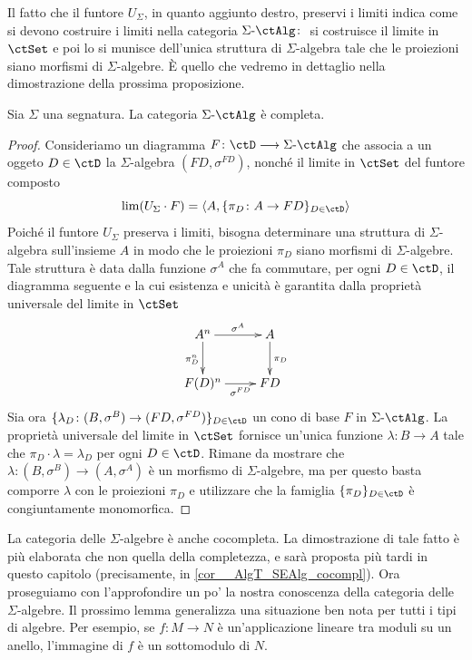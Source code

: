 Il fatto che il funtore \(U_{\Sigma}\), in quanto aggiunto destro, preservi i limiti indica come si devono costruire i limiti nella
categoria \(\ctSAlg \colon\) si costruisce il limite in \(\ctSet\) e poi lo si munisce dell'unica struttura di \(\Sigma\)-algebra tale che
le proiezioni siano morfismi di \(\Sigma\)-algebre. È quello che vedremo in dettaglio nella dimostrazione della prossima proposizione.

\begin{proposition}\label{prop_alg_compl}
 Sia \(\Sigma\) una segnatura. La categoria \(\ctSAlg\) è completa.
\end{proposition}

\begin{proof}
 Consideriamo un diagramma \(F \colon \ctD \fun \ctSAlg\) che associa a un oggeto \(D \in \ctD\) la \(\Sigma\)-algebra
 \((FD, \sigma^{FD})\), nonché il limite in \(\ctSet\) del funtore composto
 \[\lim(U_{\Sigma} \cdot F) = \langle A, \{ \pi_D \colon A \to FD\}_{D \in \ctD} \rangle\]
 Poiché il funtore \(U_{\Sigma}\) preserva i limiti, bisogna determinare una struttura di \(\Sigma\)-algebra sull'insieme
 \(A\) in modo che le proiezioni \(\pi_D\) siano morfismi di \(\Sigma\)-algebre. Tale struttura è data dalla funzione
 \(\sigma^A\) che fa commutare, per ogni \(D \in \ctD\), il diagramma seguente e la cui esistenza e unicità è garantita dalla
 proprietà universale del limite in \(\ctSet\)
 \[\xymatrix{A^n \ar[r]^-{\sigma^A} \ar[d]_{\pi^n_D} & A \ar[d]^{\pi_D} \\
  F(D)^n \ar[r]_-{\sigma^{FD}} & FD}\]
 Sia ora \(\{\lambda_D \colon (B,\sigma^B) \to (FD, \sigma^{FD})\}_{D \in \ctD}\) un cono di base \(F\) in \(\ctSAlg\). La proprietà
 universale del limite in \(\ctSet\) fornisce un'unica funzione \(\lambda \colon B \to A\) tale che \(\pi_D \cdot \lambda = \lambda_D\)
 per ogni \(D \in \ctD\). Rimane da mostrare che \(\lambda \colon (B,\sigma^B) \to (A, \sigma^A)\) è un morfismo di \(\Sigma\)-algebre,
 ma per questo basta comporre \(\lambda\) con le proiezioni \(\pi_D\) e utilizzare che la famiglia \(\{\pi_D\}_{D \in \ctD}\) è
 congiuntamente monomorfica.
\end{proof}

La categoria delle \(\Sigma\)-algebre è anche cocompleta. La dimostrazione di tale fatto è più elaborata che non quella della completezza, e sarà proposta più tardi in questo capitolo (precisamente, in \ref{cor__AlgT_SEAlg_cocompl}). Ora proseguiamo con l'approfondire un po' la nostra
conoscenza della categoria delle \(\Sigma\)-algebre. Il prossimo lemma generalizza una situazione ben nota per tutti i tipi di algebre.
Per esempio, se \(f \colon M \to N\) è un'applicazione lineare tra moduli su un anello, l'immagine di \(f\) è un sottomodulo di \(N\).

